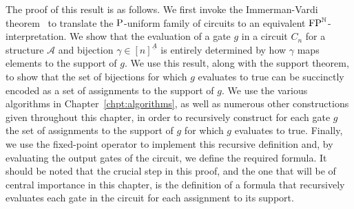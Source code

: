 \documentclass[../main/thesis.tex]{subfiles}
\begin{document}









The proof of this result is as follows. We first invoke the
Immerman-Vardi theorem~\cite{Immerman198686, Vardi:1982} to translate the
$\mathrm{P}$-uniform family of circuits to an equivalent $\text{\upshape FP}^{\mathbb{N}}$-interpretation. We
show that the evaluation of a gate $g$ in a circuit $C_n$ for a structure
$\mathcal{A}$ and bijection $\gamma \in [n]^{\underline{A}}$ is entirely
determined by how $\gamma$ maps elements to the support of $g$. We use this
result, along with the support theorem, to show that the set of bijections for
which $g$ evaluates to true can be succinctly encoded as a set of assignments to
the support of $g$. We use the various algorithms in
Chapter~\ref{chpt:algorithms}, as well as numerous other constructions given
throughout this chapter, in order to recursively construct for each gate $g$ the
set of assignments to the support of $g$ for which $g$ evaluates to true.
Finally, we use the fixed-point operator to implement this recursive definition
and, by evaluating the output gates of the circuit, we define the required
formula. It should be noted that the crucial step in this proof, and the one
that will be of central importance in this chapter, is the definition of a
formula that recursively evaluates each gate in the circuit for each assignment
to its support.
\end{document}
